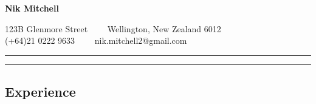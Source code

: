 \documentclass[10pt,letterpaper]{article}
\begin{document}
\begin{center}
{\LARGE \textbf{Nik Mitchell}}

123B Glenmore Street\ \ \textbullet
\ \ Wellington, New Zealand 6012
\\
(+64)21 0222 9633\ \ \textbullet
\ \ nik.mitchell2@gmail.com
\end{center}

\hrule
\vspace{-0.4em}



\hrule
\vspace{-0.4em}

\subsection*{Experience}
\end{document}
